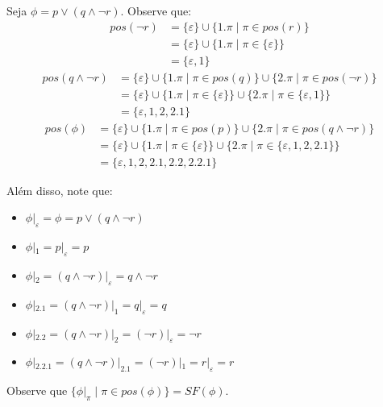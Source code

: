\begin{example}
    Seja $\phi = p \vee (q \wedge \neg r)$. Observe que:
    \begin{equation*}
        \begin{split}
            pos(\neg r) & = \{\varepsilon\} \cup \{1.\pi \mid \pi \in pos(r)\} \\
                        & = \{\varepsilon\} \cup \{1.\pi \mid \pi \in \{\varepsilon\}\} \\
                        & = \{\varepsilon,1\}
        \end{split}
    \end{equation*}
    \begin{equation*}
        \begin{split}
            pos(q \wedge \neg r) & = \{\varepsilon\} \cup \{1.\pi \mid \pi \in pos(q)\} \cup \{2.\pi \mid \pi \in pos(\neg r)\} \\
                                 & = \{\varepsilon\} \cup \{1.\pi \mid \pi \in \{\varepsilon\}\} \cup \{2.\pi \mid \pi \in \{\varepsilon,1\}\} \\
                                 & = \{\varepsilon,1,2,2.1\}
        \end{split}
    \end{equation*}
    \begin{equation*}
        \begin{split}
            pos(\phi) & = \{\varepsilon\} \cup \{1.\pi \mid \pi \in pos(p)\} \cup \{2.\pi \mid \pi \in pos(q \wedge \neg r)\} \\
                      & = \{\varepsilon\} \cup \{1.\pi \mid \pi \in \{\varepsilon\}\} \cup \{2.\pi \mid \pi \in \{\varepsilon,1,2,2.1\}\} \\
                      & = \{\varepsilon,1,2,2.1,2.2,2.2.1\}
        \end{split}
    \end{equation*}
    
    Além disso, note que:
    \begin{itemize}
        \item $\phi|_{\varepsilon} = \phi = p \vee (q \wedge \neg r)$
        \item $\phi|_{1} = p|_{\varepsilon} = p$
        \item $\phi|_{2} = (q \wedge \neg r)|_{\varepsilon} = q \wedge \neg r$
        \item $\phi|_{2.1} = (q \wedge \neg r)|_{1} = q|_{\varepsilon} = q$
        \item $\phi|_{2.2} = (q \wedge \neg r)|_{2} = (\neg r)|_{\varepsilon} = \neg r$
        \item $\phi|_{2.2.1} = (q \wedge \neg r)|_{2.1} = (\neg r)|_{1} = r|_{\varepsilon} = r$
    \end{itemize}
    
    Observe que $\{\phi|_\pi \mid \pi \in pos(\phi)\} = SF(\phi)$.
\end{example}

